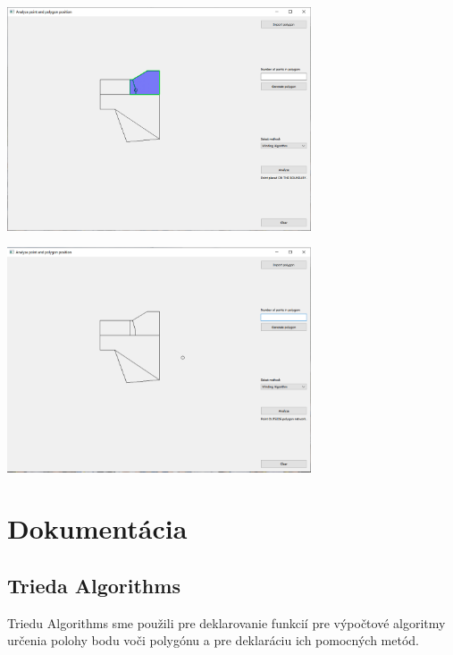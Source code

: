 \documentclass[12pt]{article}
\begin{document}

\begin{center}
   \includegraphics[width=9cm]{./img/na_hrane.png}
\end{center}

\begin{center}
   \includegraphics[width=9cm]{./img/mimo.png}
\end{center}

\section{Dokumentácia}
\subsection{Trieda Algorithms}
Triedu Algorithms sme použili pre deklarovanie funkcií pre výpočtové algoritmy určenia polohy bodu voči polygónu a pre deklaráciu ich pomocných metód.
\end{document}
